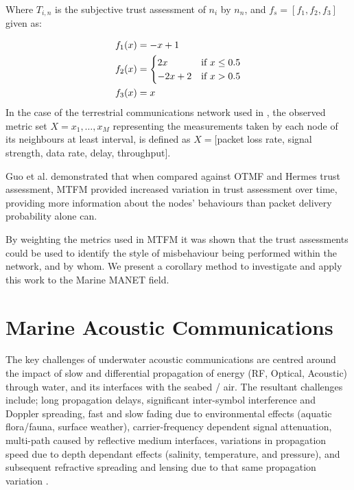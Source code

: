 Where $T_{i,n}$ is the subjective trust assessment of $n_i$ by $n_n$, and $f_s = [ f_1,f_2, f_3]$ given as:

\begin{align}
	\label{eq:whitenization}
	f_1(x)&= -x+1\notag\\
	f_2(x)&= 
	\begin{cases}
		2x & \text{if }x\leq 0.5\\
		-2x+2 & \text{if }x>0.5
	\end{cases}\\
	f_3(x)&= x\notag
\end{align}
%
In the case of the terrestrial communications network used in \cite{Guo11}, the observed metric set $X = {x_1,\dots,x_M}$ representing the measurements taken by each node of its neighbours at least interval, is defined as $X=[$packet loss rate, signal strength, data rate, delay, throughput$]$.

Guo et al. demonstrated that when compared against OTMF and Hermes trust assessment, MTFM provided increased variation in trust assessment over time, providing more information about the nodes' behaviours than packet delivery probability alone can.

By weighting the metrics used in MTFM it was shown that the trust assessments could be used to identify the style of misbehaviour being performed within the network, and by whom.
We present a corollary method to investigate and apply this work to the Marine MANET field.


\section{Marine Acoustic Communications}\label{sec:marineacousticnetworks}

The key challenges of underwater acoustic communications are centred around the impact of slow and differential propagation of energy (RF, Optical, Acoustic) through water, and its interfaces with the seabed / air.
The resultant challenges include; long propagation delays, significant inter-symbol interference and Doppler spreading, fast and slow fading due to environmental effects (aquatic flora/fauna, surface weather), carrier-frequency dependent signal attenuation, multi-path caused by reflective medium interfaces, variations in propagation speed due to depth dependant effects (salinity, temperature, and pressure), and subsequent refractive spreading and lensing due to that same propagation variation \cite{Partan2006}.

